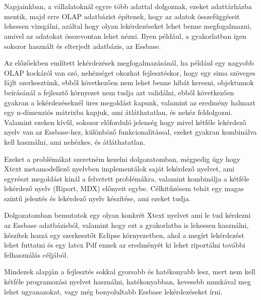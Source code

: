 \chapter*{\bevezeto}
Napjainkban, a vállalatoknál egyre több adattal dolgoznak, ezeket adattárházba mentik, 
majd erre OLAP adatbázist építenek, hogy az adatok összefüggéseit lehessen vizsgálni, 
azáltal hogy olyan lekérdezéseket lehet benne megfogalmazni, amivel az adatokat összevontan lehet nézni. 
Ilyen például, a gyakorlatban igen sokszor használt és elterjedt adatbázis, az Essbase.

Az előzőekben említett lekérdezések megfogalmazásánál, ha például egy nagyobb OLAP kockáról van szó, 
nehézséget okozhat fejlesztéskor, hogy egy sima szöveges fájlt szerkesztünk, 
ebből következően nem lehet benne hibát keresni, objektumok beírásánál a
fejlesztő környezet nem tudja azt validálni, ebből következően gyakran a
lekérdezéseknél üres megoldást kapunk, valamint az eredmény halmazt egy
n-dimenziós mátrixba kapjuk, ami átláthatatlan, és nehéz feldolgozni. Valamint
ezeken kívűl, sokszor előforduló jelenség hogy mivel kétféle lekérdező nyelv van
az Essbase-hez, különböző funkcionalitással, ezeket gyakran kombinálva kell
használni, ami nehézkes, és átláthatatlan.

Ezeket a problémákat szeretném kezelni dolgozatomban, mégpedig úgy hogy Xtext
metamodellező nyelvben implementálok saját lekérdező nyelvet, ami egyrészt
megoldást kínál a felvetett problémákra, valamint kombinálja a kétféle lekérdező
nyelv (Riport, MDX) előnyeit egybe. Célkitűzésem tehát egy magas szintű jelentés
és lekérdező nyelv készítése, ami ezeket tudja.

Dolgozatomban bemutatok egy olyan konkrét Xtext nyelvet ami le tud kérdezni az
Essbase adatbázisból, valamint hogy ezt a gyakorlatba is lehessen használni,
készítek hozzá egy szerkesztőt Eclipse környezetben, ahol a megírt lekérdezést
lehet futtatni és egy latex Pdf ennek az eredményét ki lehet riportálni további
felhasználás céljából.

Mindezek alapján a fejlesztés sokkal gyorsabb és hatékonyabb lesz, mert nem kell
kétféle programozási nyelvet használni, hatékonyabban, kevesebb munkával meg
lehet ugyanazokat, vagy még bonyolultabb Essbase lekérdezéseket írni.


 
